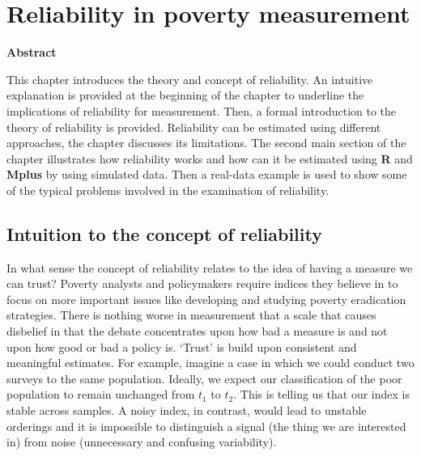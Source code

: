 \documentclass[]{book}
\begin{document}
\hypertarget{Chapter-3}{%
\chapter{Reliability in poverty measurement}\label{Chapter-3}}

\textbf{Abstract}

This chapter introduces the theory and concept of reliability. An intuitive explanation is provided at the beginning of the chapter to underline the implications of reliability for measurement. Then, a formal introduction to the theory of reliability is provided. Reliability can be estimated using different approaches, the chapter discusses its limitations. The second main section of the chapter illustrates how reliability works and how can it be estimated using \textbf{R} and \textbf{Mplus} by using simulated data. Then a real-data example is used to show some of the typical problems involved in the examination of reliability.

\hypertarget{intuition-to-the-concept-of-reliability}{%
\section{Intuition to the concept of reliability}\label{intuition-to-the-concept-of-reliability}}

In what sense the concept of reliability relates to the idea of having a measure we can trust? Poverty analysts and policymakers require indices they believe in to focus on more important issues like developing and studying poverty eradication strategies. There is nothing worse in measurement that a scale that causes disbelief in that the debate concentrates upon how bad a measure is and not upon how good or bad a policy is. `Trust' is build upon consistent and meaningful estimates. For example, imagine a case in which we could conduct two surveys to the same population. Ideally, we expect our classification of the poor population to remain unchanged from \(t_1\) to \(t_2\). This is telling us that our index is stable across samples. A noisy index, in contrast, would lead to unstable orderings and it is impossible to distinguish a signal (the thing we are interested in) from noise (unnecessary and confusing variability).
\end{document}
